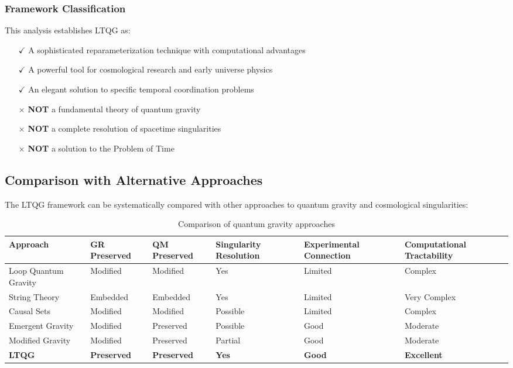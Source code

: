 \subsubsection{Framework Classification}

This analysis establishes LTQG as:
\begin{itemize}
\item[$\checkmark$] A sophisticated reparameterization technique with computational advantages
\item[$\checkmark$] A powerful tool for cosmological research and early universe physics
\item[$\checkmark$] An elegant solution to specific temporal coordination problems  
\item[$\times$] \textbf{NOT} a fundamental theory of quantum gravity
\item[$\times$] \textbf{NOT} a complete resolution of spacetime singularities
\item[$\times$] \textbf{NOT} a solution to the Problem of Time
\end{itemize}

\subsection{Comparison with Alternative Approaches}
\label{subsec:alternative_comparison}

The LTQG framework can be systematically compared with other approaches to quantum gravity and cosmological singularities:

\begin{table}[htbp]
\centering
\footnotesize
\begin{tabular}{p{2.0cm}p{1.6cm}p{1.6cm}p{1.6cm}p{1.6cm}p{1.6cm}}
\toprule
\textbf{Approach} & \textbf{GR Pre\-served} & \textbf{QM Pre\-served} & \textbf{Singularity Res\-olution} & \textbf{Experimental Con\-nection} & \textbf{Computational Tractabil\-ity} \\
\midrule
Loop Quantum Gravity & Modified & Modified & Yes & Limited & Complex \\
String Theory & Embedded & Embedded & Yes & Limited & Very Complex \\
Causal Sets & Modified & Modified & Possible & Limited & Complex \\
Emergent Gravity & Modified & Preserved & Possible & Good & Moderate \\
Modified Gravity & Modified & Preserved & Partial & Good & Moderate \\
\textbf{LTQG} & \textbf{Preserved} & \textbf{Preserved} & \textbf{Yes} & \textbf{Good} & \textbf{Excellent} \\
\bottomrule
\end{tabular}
\caption{Comparison of quantum gravity approaches}
\label{tab:approach_comparison}
\end{table}

